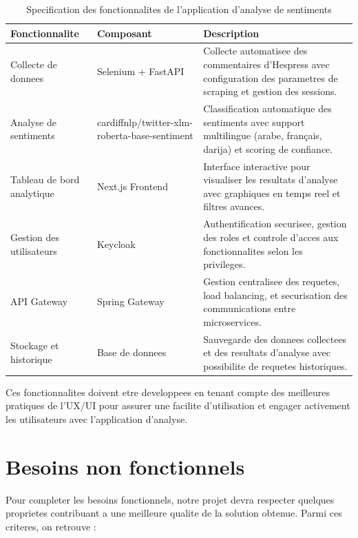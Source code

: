 \begin{table}[H]
\centering
\begin{tabularx}{\textwidth}{|l|l|X|}
\hline
\textbf{Fonctionnalite} & \textbf{Composant} & \textbf{Description} \\
\hline
Collecte de donnees & Selenium + FastAPI & 
Collecte automatisee des commentaires d'Hespress avec configuration des parametres de scraping et gestion des sessions. \\
\hline
Analyse de sentiments & cardiffnlp/twitter-xlm-roberta-base-sentiment & 
Classification automatique des sentiments avec support multilingue (arabe, français, darija) et scoring de confiance. \\
\hline
Tableau de bord analytique & Next.js Frontend & 
Interface interactive pour visualiser les resultats d'analyse avec graphiques en temps reel et filtres avances. \\
\hline
Gestion des utilisateurs & Keycloak & 
Authentification securisee, gestion des roles et controle d'acces aux fonctionnalites selon les privileges. \\
\hline
API Gateway & Spring Gateway & 
Gestion centralisee des requetes, load balancing, et securisation des communications entre microservices. \\
\hline
Stockage et historique & Base de donnees & 
Sauvegarde des donnees collectees et des resultats d'analyse avec possibilite de requetes historiques. \\
\hline
\end{tabularx}
\caption{Specification des fonctionnalites de l'application d'analyse de sentiments}
\label{tab:spec-fonctionnalites}
\end{table}

Ces fonctionnalites doivent etre developpees en tenant compte des meilleures pratiques de l'UX/UI pour assurer une facilite d'utilisation et engager activement les utilisateurs avec l'application d'analyse.

\section{Besoins non fonctionnels}

Pour completer les besoins fonctionnels, notre projet devra respecter quelques proprietes contribuant a une meilleure qualite de la solution obtenue. Parmi ces criteres, on retrouve :

